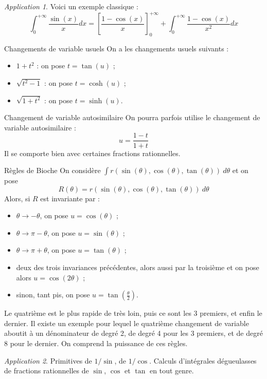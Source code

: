 \documentclass[french]{book}
\theoremstyle{plain}
\theoremstyle{definition}
\theoremstyle{remark}
\newtheorem*{app}{Application}
\begin{document}
\begin{app}
	Voici un exemple classique : $$\int_{0}^{+\infty}\frac{\sin(x)}{x}dx=\left[\frac{1-\cos(x)}{x}\right]_0^{+\infty}+\int_{0}^{+\infty}\frac{1-\cos(x)}{x^2}dx$$
\end{app}
\begin{AS}{Changements de variable usuels} On a les changements usuels suivants : 
\begin{itemize}
	\item $1+t^2$ : on pose $t=\tan(u)$ ;
	\item $\sqrt{t^2-1}$ : on pose $t=\cosh(u)$ ;
	\item $\sqrt{1+t^2}$ : on pose $t=\sinh(u)$.
\end{itemize}
\end{AS}\begin{AS}{Changement de variable autosimilaire} On pourra parfois utilise le changement de variable autosimilaire : $$u=\frac{1-t}{1+t}$$ Il se comporte bien avec certaines fractions rationnelles.
\end{AS}\begin{AS}{Règles de Bioche} On considère $\displaystyle\int r(\sin(\theta),\cos(\theta),\tan(\theta))\ d\theta$ et on pose $$R(\theta)=r(\sin(\theta),\cos(\theta),\tan(\theta))\ d\theta$$ Alors, si $R$ est invariante par :
\begin{itemize}
	\item $\theta \to -\theta$, on pose $u=\cos(\theta)$ ;
	\item $\theta \to \pi-\theta$, on pose $u=\sin(\theta)$ ;
	\item $\theta \to \pi+\theta$, on pose $u=\tan(\theta)$ ;
	\item deux des trois invariances précédentes, alors aussi par la troisième et on pose alors $u=\cos(2\theta)$ ;
	\item sinon, tant pis, on pose $\displaystyle u=\tan\left(\frac{\theta}{2}\right)$.
\end{itemize}
Le quatrième est le plus rapide de très loin, puis ce sont les 3 premiers, et enfin le dernier. Il existe un exemple pour lequel le quatrième changement de variable aboutit à un dénominateur de degré 2, de degré 4 pour les 3 premiers, et de degré 8 pour le dernier. On comprend la puissance de ces règles.
\end{AS}
\begin{app}
	Primitives de $1/\sin$, de $1/\cos$. Calculs d'intégrales dégueulasses de fractions rationnelles de $\sin$, $\cos$ et $\tan$ en tout genre.
\end{app}
\end{document}
